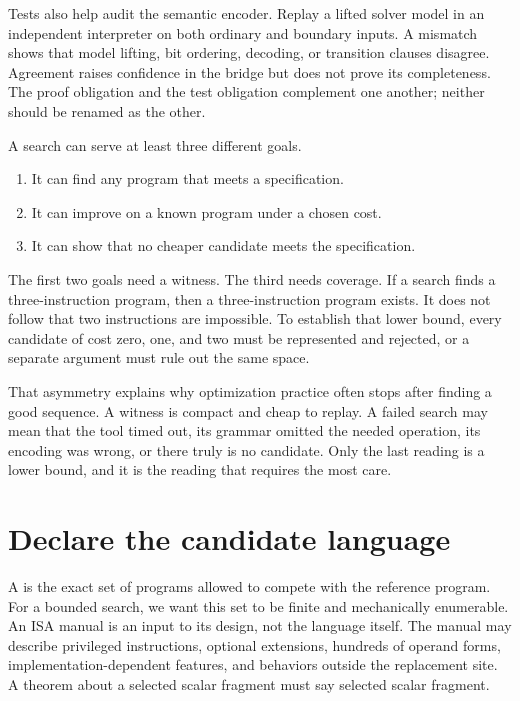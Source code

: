 Tests also help audit the semantic encoder. Replay a lifted solver model in an
independent interpreter on both ordinary and boundary inputs. A mismatch
shows that model lifting, bit ordering, decoding, or transition clauses
disagree. Agreement raises confidence in the bridge but does not prove its
completeness. The proof obligation and the test obligation complement one
another; neither should be renamed as the other.

A search can serve at least three different goals.

\begin{enumerate}
\item It can find any program that meets a specification.
\item It can improve on a known program under a chosen cost.
\item It can show that no cheaper candidate meets the specification.
\end{enumerate}

The first two goals need a witness. The third needs coverage. If a search
finds a three-instruction program, then a three-instruction program exists.
It does not follow that two instructions are impossible. To establish that
lower bound, every candidate of cost zero, one, and two must be represented
and rejected, or a separate argument must rule out the same space.

That asymmetry explains why optimization practice often stops after finding a
good sequence. A witness is compact and cheap to replay. A failed search may
mean that the tool timed out, its grammar omitted the needed operation, its
encoding was wrong, or there truly is no candidate. Only the last reading is
a lower bound, and it is the reading that requires the most care.

\section{Declare the candidate language}

A  is the exact set of programs allowed to compete
with the reference program. For a bounded search, we want this set to be
finite and mechanically enumerable. An ISA manual is an input to its design,
not the language itself. The manual may describe privileged instructions,
optional extensions, hundreds of operand forms, implementation-dependent
features, and behaviors outside the replacement site. A theorem about a
selected scalar fragment must say selected scalar fragment.

